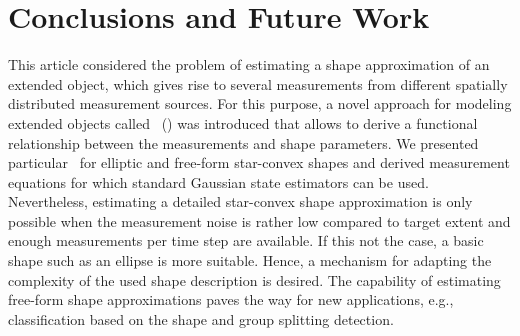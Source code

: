\documentclass[preprint,1p,11pt]{ISAS_IR}
\newcommand{\placeFig}[1]{}
\begin{document}
\placeFig{9}


\placeFig{10}


\placeFig{11}

\chapter{Conclusions and Future Work}\label{sec:conclusions}
This article considered the problem of estimating a shape approximation of an extended object, which gives rise to several measurements from different spatially distributed measurement sources. 
For this purpose, a novel approach for modeling  extended objects called \RHM\ (\rhm) was introduced that allows to derive a functional relationship between the measurements and shape parameters. We presented particular \rhms\ for elliptic and free-form star-convex shapes and derived measurement equations for which   standard Gaussian state estimators can be used. Nevertheless, estimating a detailed star-convex shape approximation is only possible when the measurement noise is rather low compared to target extent and enough measurements per time step are available. If this not the case, a basic shape such as an ellipse is more suitable.  Hence, a mechanism for  adapting the complexity of the used shape description is desired.  The   capability of estimating free-form shape approximations paves the way for new  applications, e.g., classification based on the shape and group splitting detection. 



\end{document}
